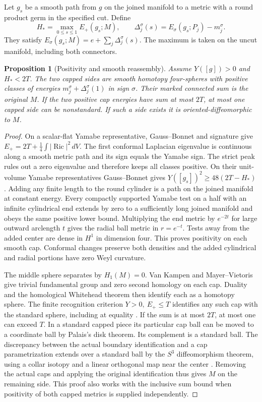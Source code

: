 \documentclass[11pt,letterpaper]{article}
\numberwithin{equation}{section}
\newtheorem{proposition}{Proposition}[section]
\DeclareMathOperator{\Ric}{Ric}
\begin{document}
Let \(g_s\) be a smooth path from \(g\) on the joined manifold to a
metric with a round product germ in the specified cut. Define
\[
 H_*=\max_{0\le s\le1}E_+(g_s;M),\qquad
 \Delta_j^\sigma(s)=E_\sigma(g_s;P_j)-m_j^\sigma .
\]
They satisfy \(E_\sigma(g_s;M)=e+\sum_j\Delta_j^\sigma(s)\).
The maximum is taken on the uncut manifold, including both connectors.

\begin{proposition}[Positivity and smooth reassembly]\label{prop:cap}
Assume \(Y([g])>0\) and \(H_*<2T\). The two capped sides are smooth
homotopy four-spheres with positive classes of energies
\(m_j^\sigma+\Delta_j^\sigma(1)\) in sign \(\sigma\). Their marked
connected sum is the original \(M\). If the two positive cap energies
have sum at most \(2T\), at most one capped side can be nonstandard.
If such a side exists it is oriented-diffeomorphic to \(M\).
\end{proposition}
\begin{proof}
On a scalar-flat Yamabe representative, Gauss--Bonnet and signature
give \(E_+=2T+\tfrac14\int|\Ric|^2\,dV\). The first conformal
Laplacian eigenvalue is continuous along a smooth metric path and
its sign equals the Yamabe sign. The strict peak rules out a zero
eigenvalue and therefore keeps all classes positive.
On their unit-volume Yamabe representatives Gauss--Bonnet gives
\(Y([g_s])^2\ge48(2T-H_*)\)
\cite{LeeParker1987Yamabe,Baker2026ChiralMaster}. Adding any finite
length to the round cylinder is a path on the joined manifold at
constant energy. Every compactly supported Yamabe test on a half with
an infinite cylindrical end extends by zero to a sufficiently long
joined manifold and obeys the same positive lower bound. Multiplying
the end metric by \(e^{-2t}\) for large outward arclength \(t\) gives
the radial ball metric in \(r=e^{-t}\). Tests away from the added
center are dense in \(H^1\) in dimension four. This proves positivity
on each smooth cap. Conformal changes preserve both densities and
the added cylindrical and radial portions have zero Weyl curvature.

The middle sphere separates by \(H_1(M)=0\). Van Kampen and
Mayer--Vietoris give trivial fundamental group and zero second
homology on each cap. Duality and the homological Whitehead theorem
then identify each as a homotopy sphere. The finite recognition
criterion \(Y>0,\ E_+\le T\) identifies any such cap with the
standard sphere, including at equality
\cite[Theorems A and B]{ChangGurskyYang2003}%
\cite{Baker2026ChiralMaster}. If the sum is at most \(2T\), at most
one can exceed \(T\). In a standard capped piece its particular cap
ball can be moved to a coordinate ball by Palais's disk theorem.
Its complement is a standard ball. The discrepancy between the
actual boundary identification and a cap parametrization extends
over a standard ball by the \(S^3\) diffeomorphism theorem, using a
collar isotopy and a linear orthogonal map near the center
\cite{Palais1960Extending,Hatcher1983Smale}. Removing the actual caps
and applying the original identification thus gives \(M\) on the
remaining side. This proof also works with the inclusive sum bound
when positivity of both capped metrics is supplied independently.
\end{proof}
\end{document}

